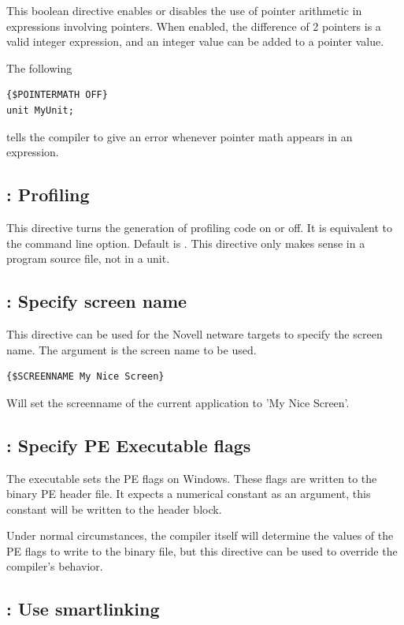 This boolean directive enables or disables the use of pointer arithmetic in
expressions involving pointers. 
When enabled, the difference of 2 pointers is a valid integer expression, and an integer value 
can be added to a pointer value.

The following 
\begin{verbatim}
{$POINTERMATH OFF}
unit MyUnit;
\end{verbatim}
tells the compiler to give an error whenever pointer math appears in an expression.

\subsection{ : Profiling}

This directive turns the generation of profiling code on or off. 
It is equivalent to the  command line option. 
Default is . 
This directive only makes sense in a program source file, not in a unit.



\subsection{ : Specify screen name}
This directive can be used for the Novell netware targets to specify the screen name. 
The argument is the screen name to be used.
\begin{verbatim}
{$SCREENNAME My Nice Screen}
\end{verbatim}
Will set the screenname of the current application to 'My Nice Screen'.

\subsection{ : Specify PE Executable flags}
The  executable sets the PE flags on Windows. These 
flags are written to the binary PE header file. It expects a numerical
constant as an argument, this constant will be written to the header block.

Under normal circumstances, the compiler itself will determine the values of
the PE flags to write to the binary file, but this directive can be used to
override the compiler's behavior.
 
\subsection{ : Use smartlinking}

